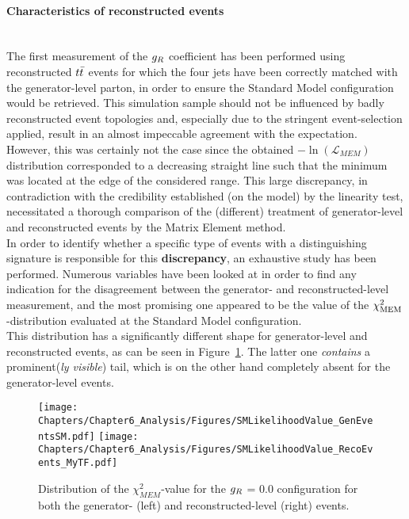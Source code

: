 \paragraph{Characteristics of reconstructed events} \hfill \\ %

The first measurement of the $g_{R}$ coefficient has been performed using reconstructed $t\bar{t}$ events for which the four jets have been correctly matched with the generator-level parton, in order to ensure the Standard Model configuration would be retrieved. This simulation sample should not be influenced by badly reconstructed event topologies and, especially due to the stringent event-selection applied, result in an almost impeccable agreement with the expectation.
\\
However, this was certainly not the case since the obtained $-\ln(\mathcal{L}_{MEM})$ distribution corresponded to a decreasing straight line such that the minimum was located at the edge of the considered range. This large discrepancy, in contradiction with the credibility established (on the model) by the linearity test, necessitated a thorough comparison of the (different) treatment of generator-level and reconstructed events by the Matrix Element method.
\\

In order to identify whether a specific type of events with a distinguishing signature is responsible for this \textbf{discrepancy}, an exhaustive study has been performed.
Numerous variables have been looked at in order to find any indication for the disagreement between the generator- and reconstructed-level measurement, and the most promising one appeared to be the value of the $\chi^{2}_{\textrm{MEM}}$-distribution evaluated at the Standard Model configuration.
\\
This distribution has a significantly different shape for generator-level and reconstructed events, as can be seen in Figure~\ref{fig::SMLik}.
The latter one \textit{contains} a prominent(\textit{ly visible}) tail, which is on the other hand completely absent for the generator-level events.
\\
\begin{figure}[h!t]
 \centering
 \texttt{[image: Chapters/Chapter6\_Analysis/Figures/SMLikelihoodValue\_GenEventsSM.pdf]} \hspace{0.3cm}
 \texttt{[image: Chapters/Chapter6\_Analysis/Figures/SMLikelihoodValue\_RecoEvents\_MyTF.pdf]}
 \caption{Distribution of the $\chi^{2}_{MEM}$-value for the $g_{R}$ = $0.0$ configuration for both the generator- (left) and reconstructed-level (right) events.} \label{fig::SMLik}
\end{figure}


